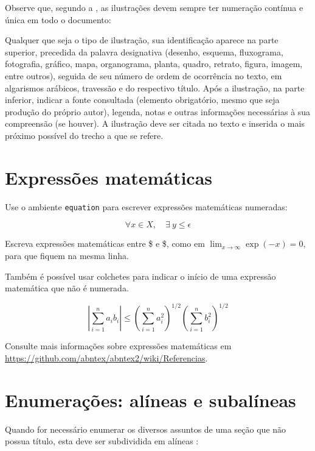 Observe que, segundo a , as
ilustrações devem sempre ter numeração contínua e única em todo o documento:

\begin{citacao}
Qualquer que seja o tipo de ilustração, sua identificação aparece na parte
superior, precedida da palavra designativa (desenho, esquema, fluxograma,
fotografia, gráfico, mapa, organograma, planta, quadro, retrato, figura,
imagem, entre outros), seguida de seu número de ordem de ocorrência no texto,
em algarismos arábicos, travessão e do respectivo título. Após a ilustração, na
parte inferior, indicar a fonte consultada (elemento obrigatório, mesmo que
seja produção do próprio autor), legenda, notas e outras informações
necessárias à sua compreensão (se houver). A ilustração deve ser citada no
texto e inserida o mais próximo possível do trecho a que se
refere. \cite[seções 5.8]{NBR14724:2011}
\end{citacao}

\section{Expressões matemáticas}

Use o ambiente \texttt{equation} para escrever
expressões matemáticas numeradas:

\begin{equation}
  \forall x \in X, \quad \exists \: y \leq \epsilon
\end{equation}

Escreva expressões matemáticas entre \$ e \$, como em $ \lim_{x \to \infty}
\exp(-x) = 0 $, para que fiquem na mesma linha.

Também é possível usar colchetes para indicar o início de uma expressão
matemática que não é numerada.

\[
\left|\sum_{i=1}^n a_ib_i\right|
\le
\left(\sum_{i=1}^n a_i^2\right)^{1/2}
\left(\sum_{i=1}^n b_i^2\right)^{1/2}
\]

Consulte mais informações sobre expressões matemáticas em
\url{https://github.com/abntex/abntex2/wiki/Referencias}.

\section{Enumerações: alíneas e subalíneas}

Quando for necessário enumerar
os diversos assuntos de uma seção que não possua título, esta deve ser
subdividida em alíneas \cite[4.2]{NBR6024:2012}:

